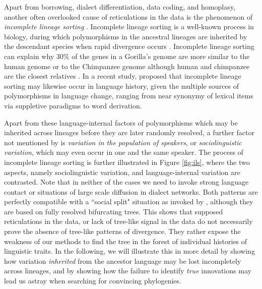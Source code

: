\documentclass[svgnames,12pt]{scrartcl}
\begin{document}
{{Apart from borrowing, dialect differentiation, data coding, and homoplasy, another often overlooked
cause of reticulations in the data is the phenomenon of \emph{incomplete lineage sorting}
\citep{Galtier2008}. Incomplete lineage sorting is a well-known process in biology, during which
polymorphisms in the ancestral lineages are inherited by the descendant species when rapid
divergence occurs \citep{Rogers2014}. Incomplete lineage sorting can explain why 30\% of the genes
in a Gorilla's genome are more similar to the human genome or to the Chimpanzee genome although
human and chimpanzee are the closest relatives \citep{Scally2012}.  In a recent study,
\citet{List2016h} proposed that incomplete lineage sorting may likewise occur in language history,
given  the multiple sources of polymorphisms in language change, ranging from near synonymy of
lexical items via suppletive paradigms to word derivation.
 
Apart from these language-internal factors of polymorphisms which may be inherited across lineages
before they are later randomly resolved, a further factor not mentioned by \citet{List2016h} is
\emph{variation in the population of speakers}, or \emph{sociolinguistic variation}, which may even
occur in one and the same speaker.  The process of incomplete lineage sorting is further illustrated
in Figure \ref{fig:ils}, where the two aspects, namely sociolinguistic variation, and
language-internal variation are contrasted. Note that in neither of the cases we need to invoke
strong language contact or situations of large scale diffusion in dialect networks. Both
patterns are perfectly compatible with a ``social split" situation as invoked by
\citet{Francois2014}, although they are based on fully resolved bifurcating trees. This shows that
supposed reticulations in the data, or lack of tree-like signal in the data do not necessarily prove
the absence of tree-like patterns of divergence. They rather expose the weakness of our methods to
find the tree in the forest of individual histories of linguistic traits. In the following, we will
illustrate this in more detail by showing how variation \emph{inherited} from the ancestor language
may be lost incompletely across lineages, and by showing how the failure to identify \emph{true}
innovations may lead us astray when searching for convincing phylogenies.

}}
\end{document}
